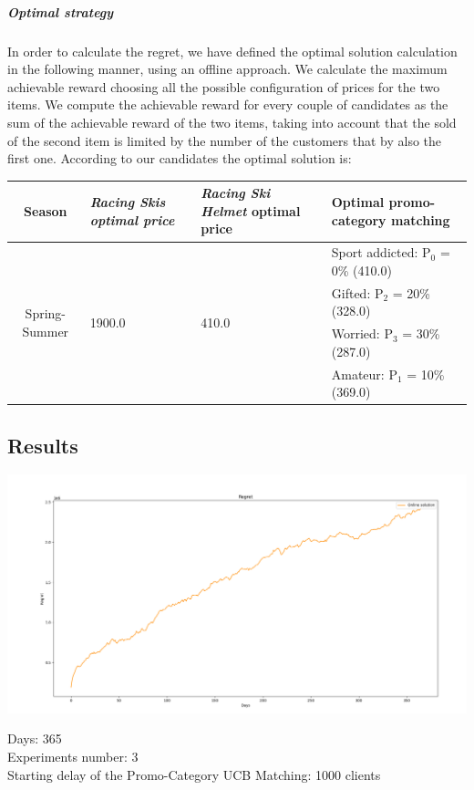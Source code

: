 \subparagraph{Optimal strategy}
In order to calculate the regret, we have defined the optimal solution calculation in the following manner, using an offline approach. We calculate the maximum achievable reward choosing all the possible configuration of prices for the two items. We compute the achievable reward for every couple of candidates as the sum of the achievable reward of the two items, taking into account that the sold of the second item is limited by the number of the customers that by also the first one. 
According to our candidates the optimal solution is:
\begin{center}
	\begin{tabular}{|c|p{4cm}|p{4cm}|p{4cm}|} 
	\hline
	Season & \textit{Racing Skis optimal price} & \textit{Racing Ski Helmet} optimal price & Optimal promo-category matching \\ \hline
	\multirow{4}{*}{Spring-Summer} & \multirow{4}{*}{1900.0} & \multirow{4}{*}{410.0} & Sport addicted: P$_0$ = 0\% (410.0)  \\ 
								   & 					   &                      & Gifted: P$_2$ = 20\% (328.0)          \\ 
								   & 					   &                      & Worried: P$_3$ = 30\% (287.0)         \\
								   & 					   &                      & Amateur: P$_1$ = 10\% (369.0)         \\ \hline
	\end{tabular}
\end{center}

\subsection*{Results}
\begin{center}
	\includegraphics[scale=0.35]{Images/n6}
\end{center}
Days: 365\\
Experiments number: 3 \\
Starting delay of the Promo-Category UCB Matching: 1000 clients\\


